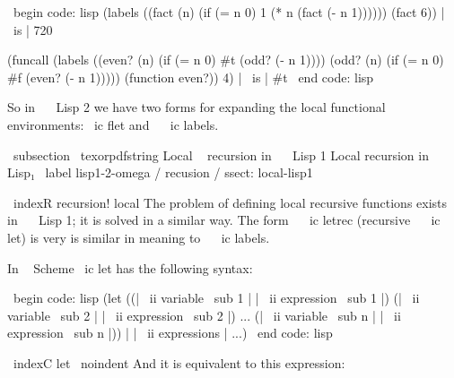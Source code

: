 \ begin {code: lisp}
(labels ((fact (n) (if (= n 0) 1
                       (* n (fact (- n 1))))))
  (fact 6)) | \ is | 720

(funcall (labels ((even? (n) (if (= n 0) #t (odd? (- n 1))))
                  (odd? (n) (if (= n 0) #f (even? (- n 1)))))
           (function even?))
         4) | \ is | #t
\ end {code: lisp}

So in ~ \ Lisp 2 we have two forms for expanding the local functional
environments: \ ic {flet} and ~ \ ic {labels}.


\ subsection { \ texorpdfstring {Local ~ recursion in ~ \ Lisp 1} %
{Local recursion in Lisp₁}} %
\ label {lisp1-2-omega / recusion / ssect: local-lisp1}

\ indexR {recursion! local}
The problem of defining local recursive functions exists in ~ \ Lisp 1;
it is solved in a similar way. The form ~ \ ic {letrec} (recursive ~ \ ic {let}) is very
is similar in meaning to ~ \ ic {labels}.

In ~ Scheme \ ic {let} has the following syntax:

\ begin {code: lisp}
(let ((| \ ii {variable \ sub {1}} | | \ ii {expression \ sub {1}} |)
      (| \ ii {variable \ sub {2}} | | \ ii {expression \ sub {2}} |)
       ...
      (| \ ii {variable \ sub {n}} | | \ ii {expression \ sub {n}} |))
  | | \ ii {expressions} | ...)
\ end {code: lisp}

\ indexC {let}
\ noindent
And it is equivalent to this expression:

